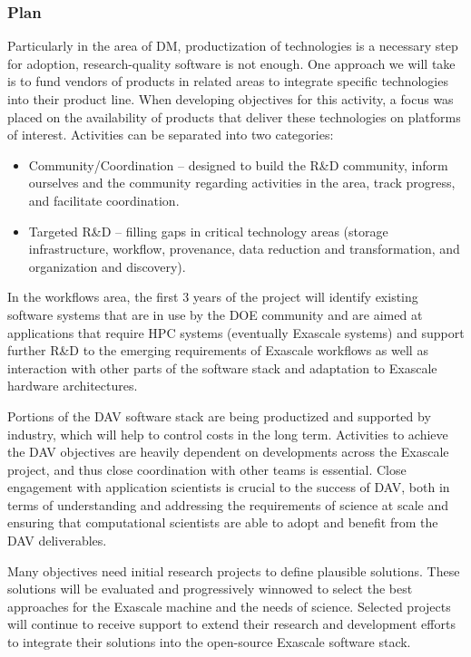 \subsubsection{Plan}
Particularly in the area of DM, productization of technologies is a necessary step for adoption, research-quality software is not enough. One approach we will take is to fund vendors of products in related areas to integrate specific technologies into their product line. When developing objectives for this activity, a focus was placed on the availability of products that deliver these technologies on platforms of interest. Activities can be separated into two categories:
\begin{itemize}
\item Community/Coordination – designed to build the R\&D community, inform ourselves and the community regarding activities in the area, track progress, and facilitate coordination.
\item Targeted R\&D – filling gaps in critical technology areas (storage infrastructure, workflow, provenance, data reduction and transformation, and organization and discovery).
\end{itemize}
In the workflows area, the first 3 years of the project will identify existing software systems that are in use by the DOE community and are aimed at applications that require HPC systems (eventually Exascale systems) and support further R\&D to the emerging requirements of Exascale workflows as well as interaction with other parts of the software stack and adaptation to Exascale hardware architectures.

Portions of the DAV software stack are being productized and supported by industry, which will help to control costs in the long term. Activities to achieve the DAV objectives are heavily dependent on developments across the Exascale project, and thus close coordination with other teams is essential. Close engagement with application scientists is crucial to the success of DAV, both in terms of understanding and addressing the requirements of science at scale and ensuring that computational scientists are able to adopt and benefit from the DAV deliverables.

Many objectives need initial research projects to define plausible solutions. These solutions will be evaluated and progressively winnowed to select the best approaches for the Exascale machine and the needs of science. Selected projects will continue to receive support to extend their research and development efforts to integrate their solutions into the open-source Exascale software stack. 

